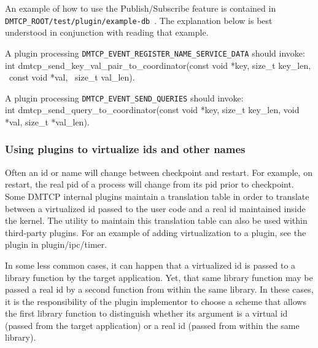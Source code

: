 \documentclass{article}
\begin{document}
An example of how to use the Publish/Subscribe feature is contained in
{\tt DMTCP\_ROOT/test/plugin/example-db}~.  The explanation below is best
understood in conjunction with reading that example.

A plugin processing {\tt DMTCP\_EVENT\_REGISTER\_NAME\_SERVICE\_DATA} should invoke: \\
int dmtcp\_send\_key\_val\_pair\_to\_coordinator(const void *key,
                                                   size\_t key\_len, \
                                                   const void *val, \
                                                   size\_t val\_len).

A plugin processing {\tt DMTCP\_EVENT\_SEND\_QUERIES} should invoke: \\
int dmtcp\_send\_query\_to\_coordinator(const void *key, size\_t key\_len,
                                            void *val, size\_t *val\_len).

\subsubsection{Using plugins to virtualize ids and other names}
\label{sec:virtualization}

Often an id or name will change between checkpoint and restart.
For example, on restart, the real pid of a process will change
from its pid prior to checkpoint.  Some DMTCP internal plugins
maintain a translation table in order to translate
between a virtualized id passed to the user code and a real id
maintained inside the kernel.  The utility to maintain this
translation table can also be used within third-party plugins.
For an example of adding virtualization to a plugin, see the plugin
in plugin/ipc/timer.

In some less common cases, it can happen that a virtualized id is passed
to a library function by the target application.  Yet, that same library
function may be passed a real id by a second function from within the
same library.  In these cases, it is the responsibility of the
plugin implementor to choose a scheme that allows the first library
function to distinguish whether its argument is a virtual id (passed
from the target application) or a real id (passed from within the same
library).
\end{document}
